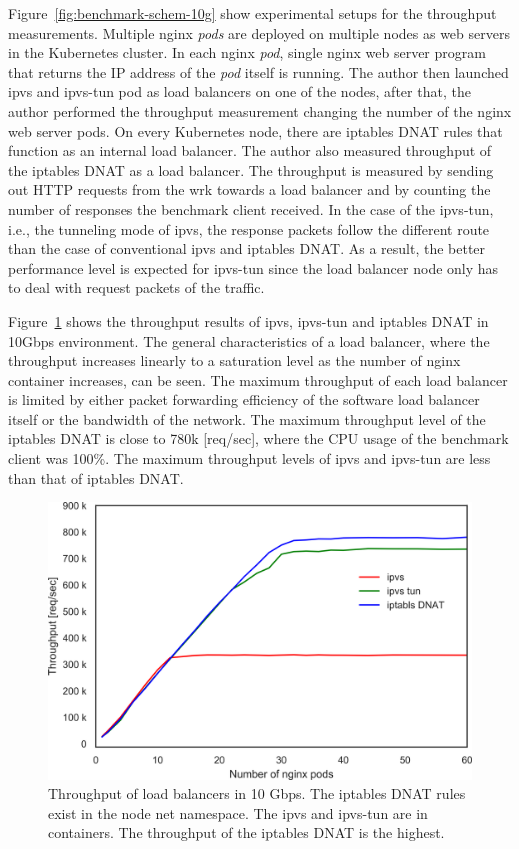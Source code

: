 Figure~\ref{fig:benchmark-schem-10g} show experimental setups for the throughput measurements.
Multiple nginx {\em pods} are deployed on multiple nodes as web servers in the Kubernetes cluster.
In each nginx {\em pod}, single nginx web server program that returns the IP address of the {\em pod} itself is running.
The author then launched ipvs and ipvs-tun pod as load balancers on one of the nodes, after that, the author performed the throughput measurement changing the number of the nginx web server pods.
On every Kubernetes node, there are iptables DNAT rules that function as an internal load balancer.
The author also measured throughput of the iptables DNAT as a load balancer.
The throughput is measured by sending out HTTP requests from the wrk towards a load balancer and by counting the number of responses the benchmark client received.
In the case of the ipvs-tun, i.e., the tunneling mode of ipvs, the response packets follow the different route than the case of conventional ipvs and iptables DNAT.
As a result, the better performance level is expected for ipvs-tun since the load balancer node only has to deal with request packets of the traffic.

\FloatBarrier

Figure~\ref{fig:ipvs_l3dsr_10g} shows the throughput results of ipvs, ipvs-tun and iptables DNAT in 10Gbps environment.
The general characteristics of a load balancer, where the throughput increases linearly to a saturation level as the number of nginx container increases, can be seen.
The maximum throughput of each load balancer is limited by either packet forwarding efficiency of the software load balancer itself or the bandwidth of the network.
The maximum throughput level of the iptables DNAT is close to 780k [req/sec], where the CPU usage of the benchmark client was 100\%.
The maximum throughput levels of ipvs and ipvs-tun are less than that of iptables DNAT. 

\begin{figure}[h]
  \centering
  \includegraphics[width=0.8\columnwidth]{Figs/ipvs_l3dsr_10g}
  \par\bigskip
  \centering
  \begin{minipage}{0.9\columnwidth}
    \caption[Throughput of load balancers in 10 Gbps]{
      Throughput of load balancers in 10 Gbps.
      The iptables DNAT rules exist in the node net namespace.
      The ipvs and ipvs-tun are in containers.
      The throughput of the iptables DNAT is the highest.
    }
    \label{fig:ipvs_l3dsr_10g}
  \end{minipage}
\end{figure}

